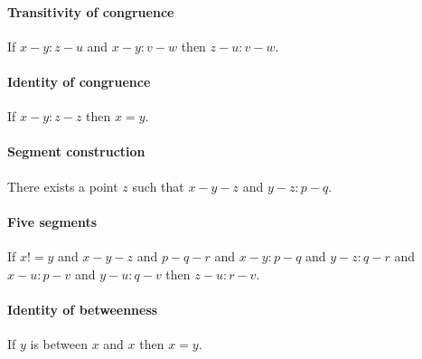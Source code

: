 \documentclass{article}
\begin{document}
  \paragraph{Transitivity of congruence}

  \begin{forthel}
    \begin{axiom}[A2]
      If $x-y : z-u$ and $x-y : v-w$ then $z-u : v-w$.
    \end{axiom}
  \end{forthel}


  \paragraph{Identity of congruence}

  \begin{forthel}
    \begin{axiom}[A3]
      If $x-y : z-z$ then $x = y$.
    \end{axiom}
  \end{forthel}


  \paragraph{Segment construction}

  \begin{forthel}
    \begin{axiom}[A4]
      There exists a point $z$ such that $x-y-z$ and $y-z : p-q$.
    \end{axiom}
  \end{forthel}


  \paragraph{Five segments}

  \begin{forthel}
    \begin{axiom}[A5]
      If $x != y$ and $x-y-z$ and $p-q-r$ and $x-y : p-q$ and $y-z : q-r$ and $x-u : p-v$ and $y-u : q-v$ then $z-u : r-v$.
    \end{axiom}
  \end{forthel}


  \paragraph{Identity of betweenness}

  \begin{forthel}
    \begin{axiom}[A6]
      If $y$ is between $x$ and $x$ then $x = y$.
    \end{axiom}
  \end{forthel}
\end{document}
